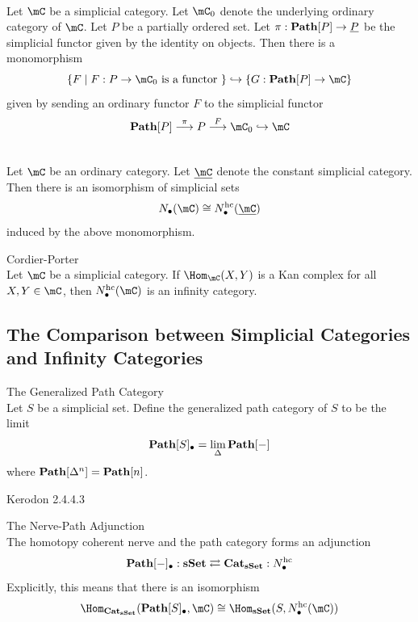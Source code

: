 \documentclass[a4paper]{article}
\begin{document}
\begin{prp}{}{}\\ Let $\mC$ be a simplicial category. Let $\mC_0$ denote the underlying ordinary category of $\mC$. Let $P$ be a partially ordered set. Let $\pi:\bold{Path}[P]\to\underline{P}$ be the simplicial functor given by the identity on objects. Then there is a monomorphism $$\{F\;|\;F:P\to\mC_0\text{ is a functor }\}\hookrightarrow\{G:\bold{Path}[P]\to\mC\}$$ given by sending an ordinary functor $F$ to the simplicial functor $$\bold{Path}[P]\overset{\pi}{\longrightarrow}P\overset{F}{\longrightarrow}\mC_0\hookrightarrow\mC$$
\end{prp}

\begin{lmm}{}{}\\ Let $\mC$ be an ordinary category. Let $\underline{\mC}$ denote the constant simplicial category. Then there is an isomorphism of simplicial sets $$N_\bullet(\mC)\cong N_\bullet^\text{hc}(\underline{\mC})$$ induced by the above monomorphism. 
\end{lmm}

\begin{thm}{Cordier-Porter}{}\\ Let $\mC$ be a simplicial category. If $\Hom_\mC(X,Y)$ is a Kan complex for all $X,Y\in\mC$, then $N_\bullet^\text{hc}(\mC)$ is an infinity category. 
\end{thm}

\subsection{The Comparison between Simplicial Categories and Infinity Categories}
\begin{defn}{The Generalized Path Category}{}\\ Let $S$ be a simplicial set. Define the generalized path category of $S$ to be the limit $$\bold{Path}[S]_\bullet=\lim_{\Delta}\bold{Path}[-]$$ where $\bold{Path}[\Delta^n]=\bold{Path}[n]$. 
\end{defn}

Kerodon 2.4.4.3

\begin{thm}{The Nerve-Path Adjunction}{}\\ The homotopy coherent nerve and the path category forms an adjunction $$\bold{Path}[-]_\bullet:\bold{sSet}\rightleftarrows\bold{Cat}_\bold{sSet}:N_\bullet^\text{hc}$$ Explicitly, this means that there is an isomorphism $$\Hom_{\bold{Cat}_\bold{sSet}}(\bold{Path}[S]_\bullet,\mC)\cong\Hom_\bold{sSet}(S,N_\bullet^\text{hc}(\mC))$$
\end{thm}
\end{document}
